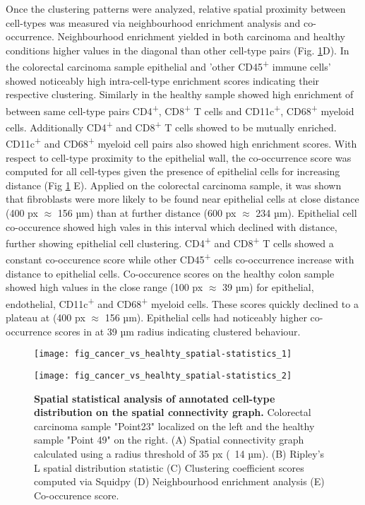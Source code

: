 Once the clustering patterns were analyzed, relative spatial proximity between cell-types was measured via neighbourhood enrichment analysis and co-occurrence. Neighbourhood enrichment yielded in both carcinoma and healthy conditions higher values in the diagonal than other cell-type pairs (Fig. \ref{fig:spatial-stats}D). In the colorectal carcinoma sample epithelial and 'other CD45\textsuperscript{+} immune cells' showed noticeably high intra-cell-type enrichment scores indicating their respective clustering. Similarly in the healthy sample showed high enrichment of between same cell-type pairs CD4\textsuperscript{+}, CD8\textsuperscript{+} T cells and CD11c\textsuperscript{+}, CD68\textsuperscript{+} myeloid cells. Additionally CD4\textsuperscript{+} and CD8\textsuperscript{+} T cells showed to be mutually enriched. CD11c\textsuperscript{+} and CD68\textsuperscript{+} myeloid cell pairs also showed high enrichment scores. With respect to cell-type proximity to the epithelial wall, the co-occurrence score was computed for all cell-types given the presence of epithelial cells for increasing distance (Fig \ref{fig:spatial-stats} E). Applied on the colorectal carcinoma sample, it was shown that fibroblasts were more likely to be found near epithelial cells at close distance (400 px $\approx$ 156 µm) than at further distance (600 px $\approx$ 234 µm). Epithelial cell co-occurence showed high vales in this interval which declined with distance, further showing epithelial cell clustering. CD4\textsuperscript{+} and CD8\textsuperscript{+} T cells showed a constant co-occurence score while other CD45\textsuperscript{+} cells co-occurrence increase with distance to epithelial cells. Co-occurence scores on the healthy colon sample showed high values in the close range (100 px $\approx$ 39 µm) for epithelial, endothelial, CD11c\textsuperscript{+} and CD68\textsuperscript{+} myeloid cells. These scores quickly declined to a plateau at (400 px $\approx$ 156 µm). Epithelial cells had noticeably higher co-occurrence scores in at 39 µm radius indicating clustered behaviour.

\begin{figure}[p]
    \centering
    \texttt{[image: fig\_cancer\_vs\_healhty\_spatial-statistics\_1]}
\end{figure}

\begin{figure}[p]
    \centering
    \texttt{[image: fig\_cancer\_vs\_healhty\_spatial-statistics\_2]}
    \caption{\textbf{Spatial statistical analysis of annotated cell-type distribution on the spatial connectivity graph.} Colorectal carcinoma sample "Point23" localized on the left and the healthy sample "Point 49" on the right. (A) Spatial connectivity graph calculated using a radius threshold of 35 px (~14 µm). (B) Ripley's L spatial distribution statistic (C) Clustering coefficient scores computed via Squidpy (D) Neighbourhood enrichment analysis (E) Co-occurence score.}
    \label{fig:spatial-stats}
\end{figure}



